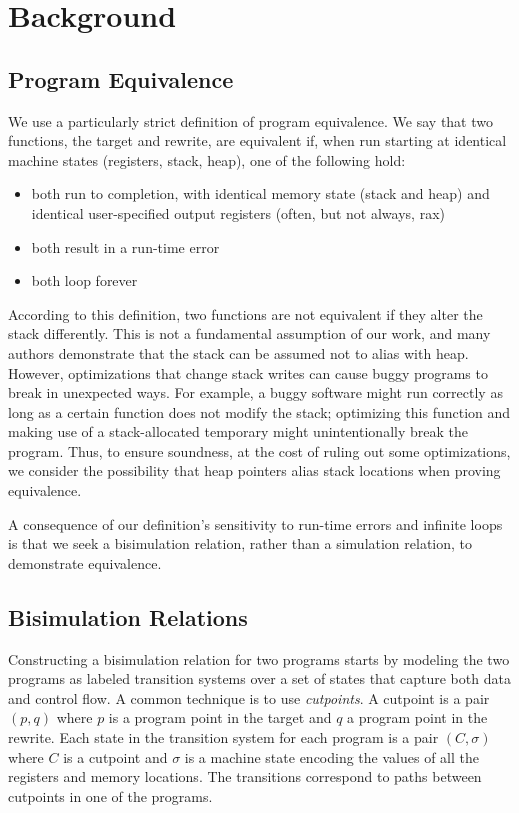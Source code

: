 \section{Background}

\subsection{Program Equivalence}

We use a particularly strict definition of program equivalence. We say
that two \arch{} functions, the target and rewrite, are equivalent
if, when run starting at identical machine states (registers, stack,
heap), one of the following hold:

\begin{itemize}
\item both run to completion, with identical memory state (stack and heap) and identical user-specified output registers (often, but not always, rax)
\item both result in a run-time error
\item both loop forever
\end{itemize}

According to this definition, two \arch{} functions are not equivalent
if they alter the stack differently. This is not a fundamental
assumption of our work, and many authors  demonstrate
that the stack can be assumed not to alias with heap. However,
optimizations that change stack writes can cause buggy programs to
break in unexpected ways. For example, a buggy software might run
correctly as long as a certain function does not modify the stack;
optimizing this function and making use of a stack-allocated temporary
might unintentionally break the program. Thus, to ensure soundness, at
the cost of ruling out some optimizations, we consider the possibility
that heap pointers alias stack locations when proving equivalence.

A consequence of our definition's sensitivity to run-time errors and
infinite loops is that we seek a bisimulation relation, rather than a
simulation relation, to demonstrate equivalence.

\subsection{Bisimulation Relations}\label{sec:proofobl}


Constructing a bisimulation relation for two programs starts by
modeling the two programs as labeled transition systems over a set of
states that capture both data and control flow. A common technique
is to use \emph{cutpoints}. A cutpoint is a pair $(p,q)$ where $p$
is a program point in the target and $q$ a program point in the
rewrite. Each state in the transition system for each program is a
pair $(C, \sigma)$ where $C$ is a cutpoint and $\sigma$ is a machine
state encoding the values of all the registers and memory locations.
The transitions correspond to paths between cutpoints in one of the
programs.

